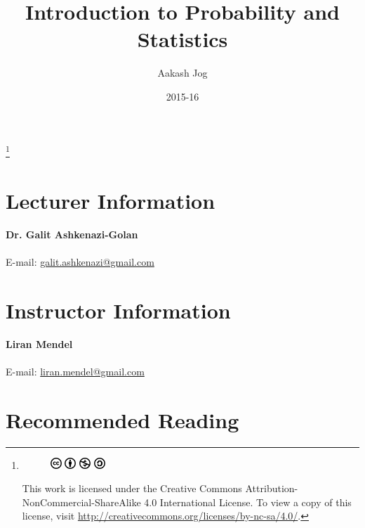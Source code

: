 \documentclass[titlepage, fleqn, a4paper, 12pt, twoside]{article}
\title{Introduction to Probability and Statistics}
\author{Aakash Jog}
\date{2015-16}
\theoremstyle{definition}
\theoremstyle{theorem}
\newcommand\blfootnote[1]{%
	\begingroup
	\renewcommand\thefootnote{}\footnote{#1}%
	\addtocounter{footnote}{-1}%
	\endgroup
}
\begin{document}
\begin{titlepage}
\maketitle
\end{titlepage}
\restoregeometry

\blfootnote
{	
	\begin{figure}[H]
		\includegraphics[height = 12pt]{cc.pdf}
		\includegraphics[height = 12pt]{by.pdf}
		\includegraphics[height = 12pt]{nc.pdf}
		\includegraphics[height = 12pt]{sa.pdf}
	\end{figure}
	This work is licensed under the Creative Commons Attribution-NonCommercial-ShareAlike 4.0 International License. To view a copy of this license, visit \url{http://creativecommons.org/licenses/by-nc-sa/4.0/}.
} %

\tableofcontents

\clearpage
\section{Lecturer Information}

\textbf{Dr. Galit Ashkenazi-Golan}\\
~\\
E-mail: \href{mailto:galit.ashkenazi@gmail.com}{galit.ashkenazi@gmail.com}\\

\section{Instructor Information}

\textbf{Liran Mendel}\\
~\\
E-mail: \href{mailto:liran.mendel@gmail.com}{liran.mendel@gmail.com}\\

\section{Recommended Reading}
\end{document}
